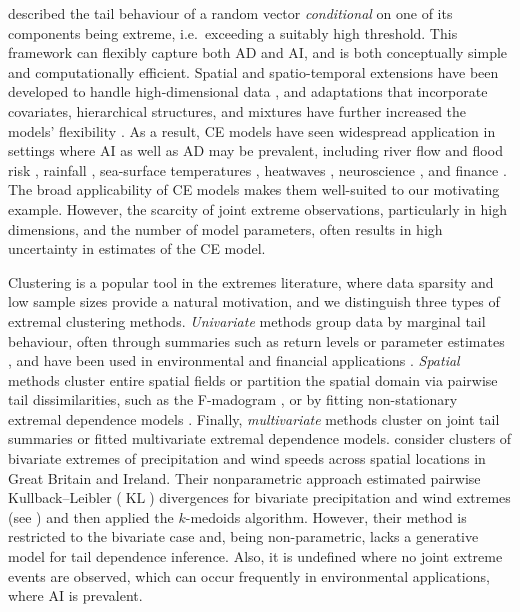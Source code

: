 \documentclass[preprint,12pt,authoryear]{elsarticle}
\DeclareMathOperator{\KL}{KL}
\begin{document}
\citet{Heffernan2004} described the tail behaviour of a random vector \emph{conditional} on one of its components being extreme, i.e.\ exceeding a suitably high threshold. 
This framework can flexibly capture both AD and AI, and is both conceptually simple and computationally efficient.
Spatial and spatio-temporal extensions have been developed to handle high-dimensional data \citep{Simpson2021, Wadsworth2022}, and adaptations that incorporate covariates, hierarchical structures, and mixtures have further increased the models' flexibility \citep{Richards2023, Tendijck2023, Talento2025}.
As a result, CE models have seen widespread application in settings where AI as well as AD may be prevalent, including river flow and flood risk \citep{Gilleland2013, Jane2020}, rainfall \citep{Richards2022}, sea-surface temperatures \citep{Simpson2023,Kakampakou2024}, heatwaves \citep{Winter2016}, neuroscience \citep{Guerrero2023, Talento2025}, and finance \citep{Hilal2014}. 
The broad applicability of CE models makes them well-suited to our motivating example.
However, the scarcity of joint extreme observations, particularly in high dimensions, and the number of model parameters, often results in high uncertainty in estimates of the CE model.

Clustering is a popular tool in the extremes literature, where data sparsity and low sample sizes provide a natural motivation, and we distinguish three types of extremal clustering methods.
\emph{Univariate} methods group data by marginal tail behaviour, often through summaries such as return levels or parameter estimates \citep{Coles2001}, and have been used in environmental and financial applications \citep{Alonso2014-rr, deCarvalho2023, Zheng2023-jf}.
\emph{Spatial} methods cluster entire spatial fields or partition the spatial domain via pairwise tail dissimilarities, such as the F-madogram \citep{Cooley2006variograms, Bernard2013}, or by fitting non-stationary extremal dependence models \citep{Carreau2017, Rohrbeck2021, Dupuis2023, Shao2025}. 
Finally, \emph{multivariate} methods cluster on joint tail summaries or fitted multivariate extremal dependence models. 
\citet{Vignotto2021} consider clusters of bivariate extremes of precipitation and wind speeds across spatial locations in Great Britain and Ireland.
Their nonparametric approach estimated pairwise Kullback--Leibler ($\KL{}$) \citep{Kullback1951} divergences for bivariate precipitation and wind extremes (see \citet{Zscheischler2021}) and then applied the $k$-medoids algorithm. 
However, their method is restricted to the bivariate case and,
being non-parametric, lacks a generative model for tail dependence inference. 
Also, it is undefined where no joint extreme events are observed, which can occur frequently in environmental applications, where AI is prevalent.
\end{document}
